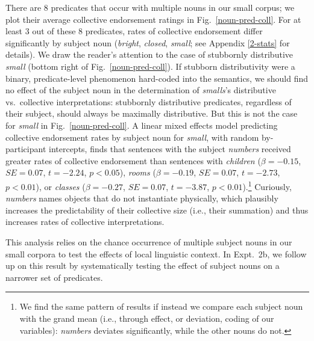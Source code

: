 \documentclass[linguex]{sp}
\newcommand{\ndg}[1]{\textcolor{Green}{[ndg: #1]}}
\newcommand{\gcs}[1]{\textcolor{blue}{[gcs: #1]}}
\begin{document}
There are 8 predicates that occur with multiple nouns in our small corpus; we plot their average collective endorsement ratings in Fig.~\ref{noun-pred-coll}.
%
%
For at least 3 out of these 8 predicates, rates of collective endorsement differ significantly by subject noun (\emph{bright}, \emph{closed}, \emph{small}; see Appendix \ref{2-stats} for details). We draw the reader's attention to the case of stubbornly distributive \emph{small} (bottom right of Fig.~\ref{noun-pred-coll}). 
If stubborn distributivity were a binary, predicate-level phenomenon hard-coded into the semantics, we should find no effect of the subject noun in the determination of \emph{smalls}'s distributive vs.~collective interpretations: stubbornly distributive predicates, regardless of their subject, should always be maximally distributive. But this is not the case for \emph{small} in Fig.~\ref{noun-pred-coll}. 
A linear mixed effects model predicting collective endorsement rates by subject noun for \emph{small}, with random by-participant intercepts, finds that sentences with the subject \emph{numbers} received greater rates of collective endorsement than sentences with \emph{children} ($\beta=-0.15$, $SE=0.07$, $t=-2.24$, $p<0.05$), \emph{rooms} ($\beta=-0.19$, $SE=0.07$, $t=-2.73$, $p<0.01$), or \emph{classes} ($\beta=-0.27$, $SE=0.07$, $t=-3.87$, $p<0.01$).\footnote{We find the same pattern of results if instead we compare each subject noun with the grand mean (i.e., through effect, or deviation, coding of our variables): \emph{numbers} deviates significantly, while the other nouns do not.} Curiously, \emph{numbers} names objects that do not instantiate physically, which plausibly increases the predictability of their collective size (i.e., their summation) and thus increases rates of collective interpretations.

This analysis relies on the chance occurrence of multiple subject nouns in our small corpora to test the effects of local linguistic context. In Expt.~2b, we follow up on this result by systematically testing the effect of subject nouns on a narrower set of predicates.
\end{document}
